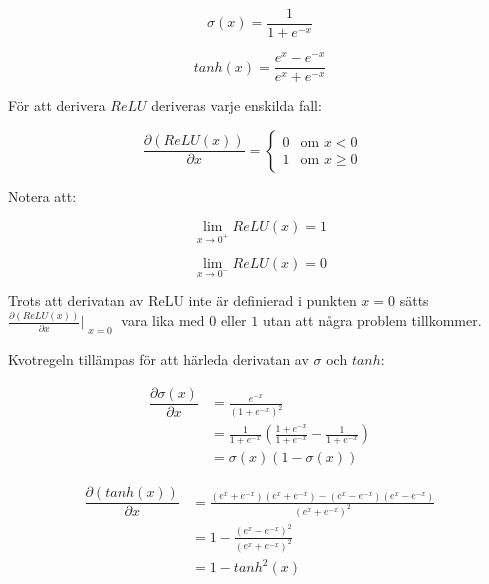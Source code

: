 \documentclass[a4paper,11pt,twoside]{article}
\newcommand*{\pd}[2]{\ensuremath{\dfrac{\partial #1}{\partial #2}}}
\newcommand*{\inpd}[2]{\ensuremath{\frac{\partial #1}{\partial #2}}}
\begin{document}
\begin{equation}
\sigma(x) = \frac{1}{1+e^{-x}}
\end{equation}

\begin{equation}
tanh(x) = \frac{e^x-e^{-x}}{e^x+e^{-x}}
\end{equation}

För att derivera $ReLU$ deriveras varje enskilda fall:

\begin{equation}
\pd{(ReLU(x))}{x} = \begin{cases} 
			0 & \mbox{om } x < 0 \\ 
			1 & \mbox{om } x \geq 0 
		\end{cases} \quad
\end{equation}

Notera att:

\begin{equation}
\lim_{x\to 0^+} ReLU(x) = 1
\end{equation}

\begin{equation}
\lim_{x\to 0^-} ReLU(x) = 0
\end{equation}

Trots att derivatan av ReLU inte är definierad i punkten $x = 0$ sätts $\inpd{(ReLU(x))}{x}|_{\substack{x=0}}$ vara lika med $0$ eller $1$ utan att några problem tillkommer. \cite{cs231n} 


Kvotregeln tillämpas för att härleda derivatan av $\sigma$ och $tanh$:

\begin{equation}
\begin{split}
\pd{\sigma(x)}{x} 	& = \frac{e^{-x}}{(1+e^{-x})^2} \\
					& = \frac{1}{1+e^{-x}}(\frac{1+e^{-x}}{1+e^{-x}}-\frac{1}{1+e^{-x}})\\
			 		& = \sigma(x)(1-\sigma(x))
\end{split}
\end{equation}

\begin{equation}
\begin{split}
\pd{(tanh(x))}{x} 	& = \frac{(e^x+e^{-x})(e^x+e^{-x})-(e^x-e^{-x})(e^x-e^{-x})}{(e^x+e^{-x})^2} \\
					& = 1 - \frac{(e^x-e^{-x})^2}{(e^x+e^{-x})^2} \\
			 		& = 1 - {tanh}^2(x)
\end{split}
\end{equation}
\end{document}
